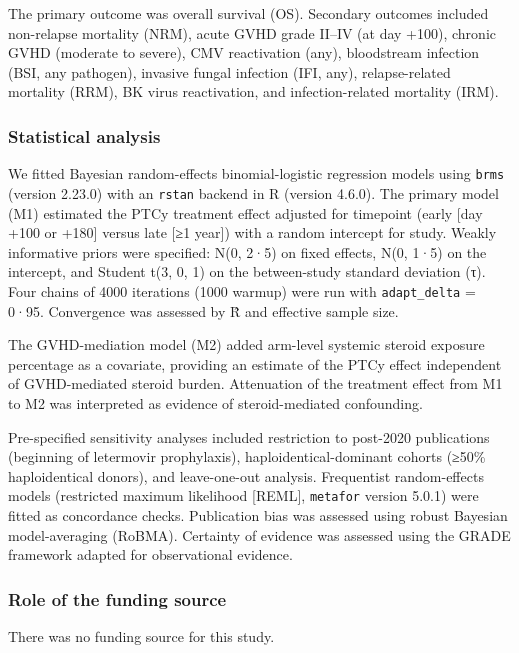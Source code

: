 \documentclass[
  british,
  8.6pt,
  a4paper,
  twocolumn]{article}
\begin{document}
The primary outcome was overall survival (OS). Secondary outcomes
included non-relapse mortality (NRM), acute GVHD grade II--IV (at day
+100), chronic GVHD (moderate to severe), CMV reactivation (any),
bloodstream infection (BSI, any pathogen), invasive fungal infection
(IFI, any), relapse-related mortality (RRM), BK virus reactivation, and
infection-related mortality (IRM).

\subsubsection{Statistical analysis}\label{statistical-analysis}

We fitted Bayesian random-effects binomial-logistic regression models
using \texttt{brms} (version 2.23.0) with an \texttt{rstan} backend in R
(version 4.6.0). The primary model (M1) estimated the PTCy treatment
effect adjusted for timepoint (early {[}day +100 or +180{]} versus late
{[}≥1 year{]}) with a random intercept for study. Weakly informative
priors were specified: N(0, 2·5) on fixed effects, N(0, 1·5) on the
intercept, and Student t(3, 0, 1) on the between-study standard
deviation (τ). Four chains of 4000 iterations (1000 warmup) were run
with \texttt{adapt\_delta} = 0·95. Convergence was assessed by R̂ and
effective sample size.

The GVHD-mediation model (M2) added arm-level systemic steroid exposure
percentage as a covariate, providing an estimate of the PTCy effect
independent of GVHD-mediated steroid burden. Attenuation of the
treatment effect from M1 to M2 was interpreted as evidence of
steroid-mediated confounding.

Pre-specified sensitivity analyses included restriction to post-2020
publications (beginning of letermovir prophylaxis),
haploidentical-dominant cohorts (≥50\% haploidentical donors), and
leave-one-out analysis. Frequentist random-effects models (restricted
maximum likelihood {[}REML{]}, \texttt{metafor} version 5.0.1) were
fitted as concordance checks. Publication bias was assessed using robust
Bayesian model-averaging (RoBMA). Certainty of evidence was assessed
using the GRADE framework adapted for observational evidence.

\subsubsection{Role of the funding
source}\label{role-of-the-funding-source}

There was no funding source for this study.
\end{document}
